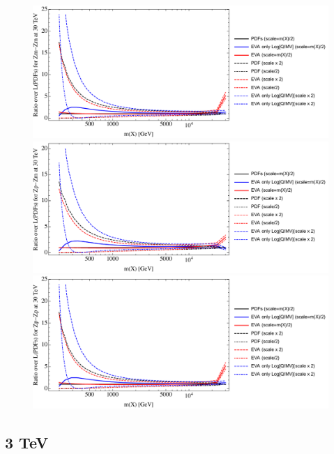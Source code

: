 \documentclass[a4paper,11pt]{article}
\begin{document}
\begin{figure}[ht]
\includegraphics[width=0.4\linewidth]{PlotLumi/30TeV/ratios/Zm-Zm.pdf}
\includegraphics[width=0.4\linewidth]{PlotLumi/30TeV/ratios/Zp-Zm.pdf}
\includegraphics[width=0.4\linewidth]{PlotLumi/30TeV/ratios/Zp-Zp.pdf}
\end{figure}

%
%

\clearpage
\subsection{3 TeV}
\end{document}

